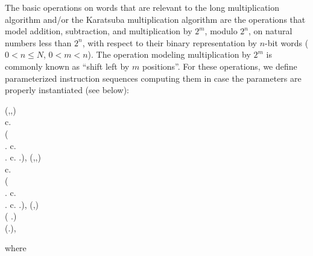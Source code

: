 \documentclass{llncs}
\begin{document}
The basic operations on words that are relevant to the long 
multiplication algorithm and/or the Karatsuba multiplication algorithm 
are the operations that model addition, subtraction, and multiplication 
by $2^m$, modulo $2^n$, on natural numbers less than $2^n$, with respect 
to their binary representation by $n$-bit words ($0 < n \leq N$, 
$0 < m < n$).
The operation modeling multiplication by $2^m$ is commonly known as 
``shift left by $m$ positions''.
For these operations, we define parameterized instruction sequences 
computing them in case the parameters are properly instantiated (see 
below):
\begin{ldispl}
(,,) \deq {} 
\\ \quad
c.\setbr{\False} \conc {}
\\ \quad
{} 
 ( \conc {}   \conc 
   \conc {}   \conc 
                     \conc {}  \conc {} 
\\ \quad {}
  .\setbr{\True} \conc c.\setbr{\False} \conc
    \conc 
   \conc {}   \conc 
      \conc {} \conc {}   \conc {} 
\\ \quad {} 
                     \conc {}   \conc 
  .\setbr{\False} \conc c.\setbr{\True} \conc
    \conc
   \conc
  .\setbr{\True})\;,
\eqnsep
{}(,,) \deq {} 
\\ \quad
c.\setbr{\False} \conc {}
\\ \quad
{} 
 ( \conc {}    \conc 
   \conc {}    \conc 
                     \conc {}   \conc {} 
\\ \quad {}
  .\setbr{\False} \conc c.\setbr{\False} \conc
    \conc 
   \conc {}    \conc 
      \conc {} \conc {}    \conc {} 
\\ \quad {} 
                     \conc {}    \conc 
  .\setbr{\True} \conc c.\setbr{\True}   \conc
    \conc
   \conc
  .\setbr{\False})\;,
\eqnsep
{}(,) \deq {}
\\ \quad
{} 
 ( \conc 
   \conc
  .\setbr{\False}) \conc {}
\\[.5ex] \quad
{} (.\setbr{\False})\;,
\end{ldispl}where 
\end{document}
